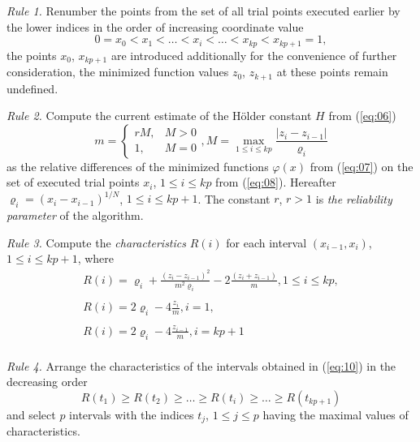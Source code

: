 \documentclass[procedia]{easychair}
\begin{document}
{\it Rule 1.} Renumber the points from the set of all trial points executed earlier by the lower indices in the order of increasing coordinate value
\begin{equation} \label{eq:08}
0 = x_0 < x_1 < \dots < x_i < \dots < x_{kp} < x_{kp+1} = 1,
\end{equation}
the points $x_0$, $x_{kp+1}$ are introduced additionally for the convenience of further consideration, the minimized function values $z_0$, $z_{k+1}$ at these points remain undefined.

{\it Rule 2.} Compute the current estimate of the H\"{o}lder constant $H$ from (\ref{eq:06})
\begin{equation} \label{eq:09}
m = 
 \begin{cases}
   r M, & M > 0 \\
   1,   & M = 0
 \end{cases} ,
 M = \max_{1 \leq i \leq kp} {\frac{|z_i - z_{i-1}|} {\varrho_i} }
\end{equation}
as the relative differences of the minimized functions $\varphi(x)$ from (\ref{eq:07}) on the set of executed trial points $x_i$, $1 \leq i \leq kp$ from (\ref{eq:08}). Hereafter  $\varrho_i = (x_i - x_{i-1})^{1 / N}$, $1 \leq i \leq kp+1$. The constant $r$, $r>1$ is {\it the reliability parameter} of the algorithm.\par

{\it Rule 3.} Compute the {\it characteristics} $R(i)$ for each interval $(x_{i-1} ,x_i)$, $1 \leq i \leq kp+1$, where
\begin{equation} \label{eq:10}
\begin{matrix}
R(i) = \varrho_i + \frac{(z_i - z_{i-1})^2}{m^2 \varrho_i} - 2 \frac{(z_i + z_{i-1})}{m}, 1 \leq i \leq kp, \\
\\
R(i) = 2 \varrho_i - 4 \frac{z_{i}} {m} , i = 1, \\
\\
R(i) = 2 \varrho_i - 4 \frac{z_{i-1}} {m} , i = kp+1 \\
\end{matrix}
\end{equation}

{\it Rule 4.} Arrange the characteristics of the intervals obtained in (\ref{eq:10}) in the decreasing order 
\begin{equation} \label{eq:11}
  R(t_1) \geq R(t_2) \geq \dots \geq R(t_i) \geq \dots \geq R(t_{kp+1})
\end{equation}
and select $p$ intervals with the indices $t_j$, $1 \leq j \leq p$ having the maximal values of characteristics.\par
\end{document}
